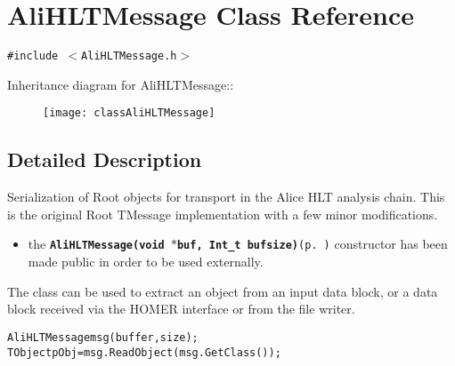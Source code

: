 \section{Ali\-HLTMessage Class Reference}
\label{classAliHLTMessage}
{\tt \#include $<$Ali\-HLTMessage.h$>$}

Inheritance diagram for Ali\-HLTMessage::\begin{figure}[H]
\begin{center}
\leavevmode
\texttt{[image: classAliHLTMessage]}
\end{center}
\end{figure}


\subsection{Detailed Description}
Serialization of Root objects for transport in the Alice HLT analysis chain. This is the original Root TMessage implementation with a few minor modifications.\begin{itemize}
\item the {\tt  {\bf Ali\-HLTMessage(void $\ast$buf, Int\_\-t bufsize)}{\rm (p.\,\pageref{classAliHLTMessage_a1})}} constructor has been made public in order to be used externally.\end{itemize}


The class can be used to extract an object from an input data block, or a data block received via the HOMER interface or from the file writer. \small\begin{alltt}
  AliHLTMessage msg(buffer, size);
  TObject pObj=msg.ReadObject(msg.GetClass());
 \end{alltt}\normalsize 
 



